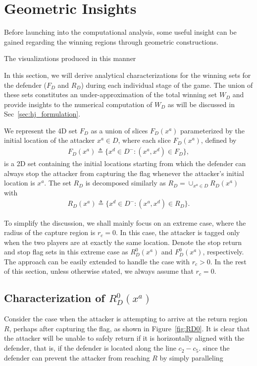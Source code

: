 \section{Geometric Insights}
\label{sec:analytic}
Before launching into the computational analysis, some useful insight can be gained regarding the winning regions through geometric constructions.  

The visualizations produced in this manner 

In this section, we will derive analytical characterizations for the winning sets for the defender ($F_D$ and $R_D$) during each individual stage of the game. The union of these sets constitutes an under-approximation of the total winning set $W_D$ and provide insights to the numerical computation of $W_D$ as will be discussed in Sec~\ref{sec:hj_formulation}.

We represent the 4D set $F_D$ as a union of slices $F_D(x^a)$ parameterized by the initial location of the attacker $x^a\in D$, where each slice $F_D(x^a)$, defined by
\begin{align*}
F_D(x^a) \triangleq \{x^d\in D^-: (x^a,x^d) \in F_D\},
\end{align*}
is a 2D set containing the initial locations starting from which the defender can always stop the attacker from capturing the flag whenever the attacker's initial location is $x^a$. The set $R_D$ is decomposed similarly as $R_D =\cup_{x^a\in D} R_D(x^a)$ with 
\begin{align*}
R_D(x^a) \triangleq \{x^d\in D^-: (x^a,x^d) \in R_D\}.
\end{align*}

To simplify the discussion, we shall mainly focus on an extreme case, where the radius of the capture region is $r_c =0$. In this case, the attacker is tagged only when the two players are at exactly the same location. Denote the stop return and stop flag sets in this extreme case as $R_D^0(x^a)$ and $F_D^0(x^a)$, respectively. The approach can be easily extended to handle the case with $r_c>0$.
In the rest of this section, unless otherwise stated, we always assume that $r_c=0$. 

\subsection{Characterization of $R_D^0(x^a)$}
\label{sec:RD0}

Consider the case when the attacker is attempting to arrive at the return region $R$, perhaps after capturing the flag, as shown in Figure~\ref{fig:RD0}.  It is clear that the attacker will be unable to safely return if it is horizontally aligned with the defender, that is, if the defender is located along the line $c_2 - c_5$.  since the defender can prevent the attacker from reaching $R$ by simply paralleling    

